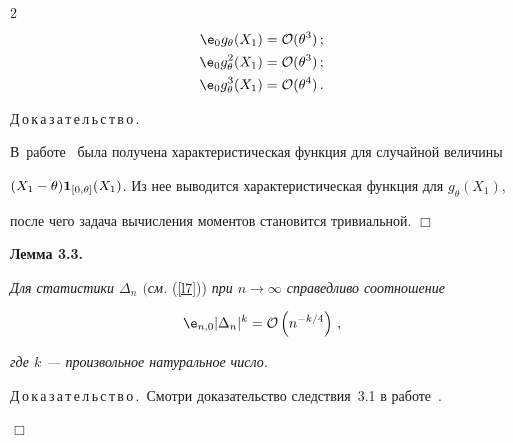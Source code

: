 \begin{multicols}{2}
\begin{align*}


{\e}_{0} g_{\theta}(X_1) &= {\cal O}(\theta^3)\,;\\


{\e}_{0} g_{\theta}^2(X_1) &= {\cal O}(\theta^3)\,;\\


{\e}_{0} g_{\theta}^3(X_1) &= {\cal O}(\theta^4)\,.


\end{align*}










\noindent


Д\,о\,к\,а\,з\,а\,т\,е\,л\,ь\,с\,т\,в\,о\,.\


В~работе~\cite{article} была получена характеристическая функция для случайной величины 


$(X_1-\theta){{\bf 1}}_{[0,\theta]}(X_1)$. Из нее выводится характеристическая функция для $g_{\theta}(X_1)$, 


после чего задача вычисления моментов становится тривиальной. \hfill $\Box$








\smallskip





\noindent


\textbf{Лемма 3.3.}


\textit{Для статистики $\Delta_n$ $($см.} (\ref{l7})) \textit{при $n \to \infty$ справедливо соотношение}


$$


{\e}_{n,0} |\Delta_n|^k = {\cal O}\left(n^{-k/4}\right)\,,


$$


\textit{где $k$ --- произвольное натуральное число.}








\smallskip





\noindent


Д\,о\,к\,а\,з\,а\,т\,е\,л\,ь\,с\,т\,в\,о\,.\ Смотри доказательство следствия~3.1 в работе~\cite{article}.


\hfill $\Box$









\end{multicols}
